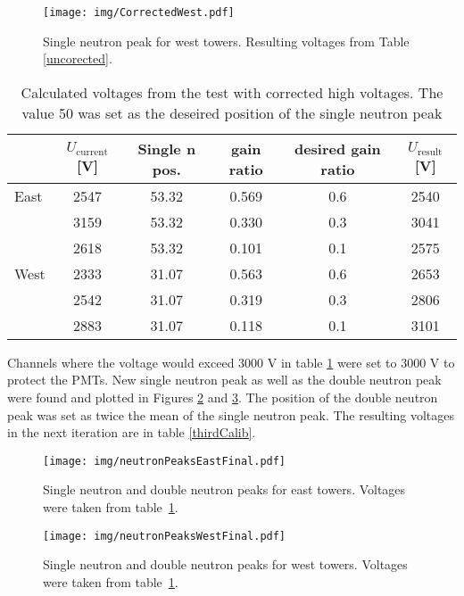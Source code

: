 \begin{figure}[htb]
\begin{center}
\texttt{[image: img/CorrectedWest.pdf]}
\end{center}
\caption{Single neutron peak for west towers. Resulting voltages from Table \ref{uncorected}.}
\label{westPlot}
\end{figure}

\begin{table}[htb] 
\caption{Calculated voltages from the test with corrected high voltages.
The value 50 was set as the deseired position of the single neutron peak}
\label{corected}
\begin{center}
\begin{tabular}{lccccc}
\toprule
&$U_\text{current}$[V]&Single n pos.&gain ratio&desired gain ratio&$U_\text{result}$[V]\\
\midrule
 East&2547&53.32&0.569&0.6&2540\\
     &3159&53.32&0.330&0.3&3041\\
     &2618&53.32&0.101&0.1&2575\\
\midrule
West&2333&31.07&0.563&0.6&2653\\
    &2542&31.07&0.319&0.3&2806\\
    &2883&31.07&0.118&0.1&3101\\
\bottomrule
\end{tabular}
\end{center}
\end{table}

Channels where the voltage would exceed 3000 V in table \ref{corected} were set to 3000 V to
protect the PMTs. New single neutron peak as well as the double neutron peak were found and
plotted in Figures \ref{eastThird}
and \ref{westThird}. The position of the double neutron peak was set as twice the mean
of the single neutron peak.
The resulting voltages in the next iteration are in table \ref{thirdCalib}.

\begin{figure}[htb]
\begin{center}
\texttt{[image: img/neutronPeaksEastFinal.pdf]}
\end{center}
\caption{Single neutron and double neutron peaks for east towers.
Voltages were taken from table~\ref{corected}.}
\label{eastThird}
\end{figure}

\begin{figure}[htb]
\begin{center}
\texttt{[image: img/neutronPeaksWestFinal.pdf]}
\end{center}
\caption{Single neutron and double neutron peaks for west towers.
Voltages were taken from table~\ref{corected}.}
\label{westThird}
\end{figure}

